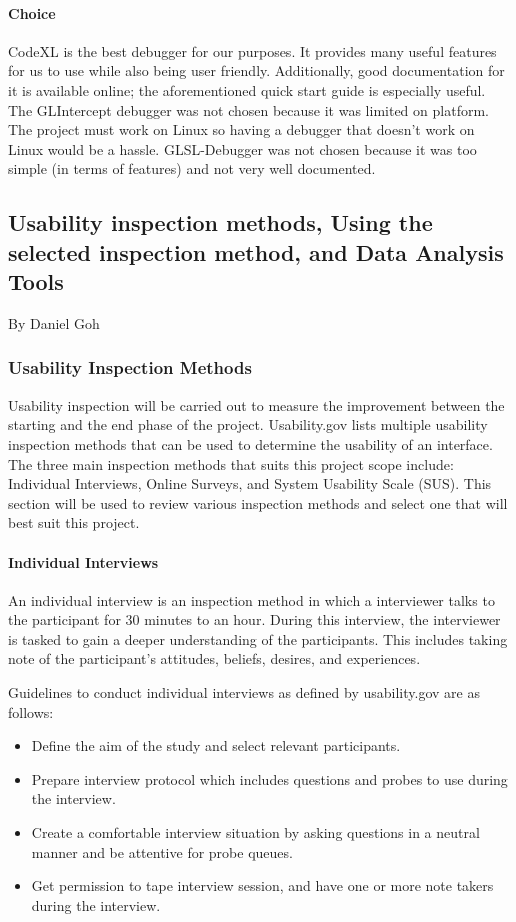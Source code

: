 \paragraph{Choice}
CodeXL is the best debugger for our purposes.
It provides many useful features for us to use while also being user friendly. 
Additionally, good documentation for it is available online; the aforementioned quick start guide is especially useful.
The GLIntercept debugger was not chosen because it was limited on platform.
The project must work on Linux so having a debugger that doesn't work on Linux would be a hassle.
GLSL-Debugger was not chosen because it was too simple (in terms of features) and not very well documented.

\newpage

\subsection{Usability inspection methods, Using the selected inspection method, and Data Analysis Tools}
\large{By Daniel Goh}

\normalsize
\subsubsection{Usability Inspection Methods}
Usability inspection will be carried out to measure the improvement between the starting and the end phase of the project.
Usability.gov lists multiple usability inspection methods that can be used to determine the usability of an interface. \cite{userResearch}
The three main inspection methods that suits this project scope include: Individual Interviews, Online Surveys, and System Usability Scale (SUS).
This section will be used to review various inspection methods and select one that will best suit this project.

\paragraph{Individual Interviews}
An individual interview is an inspection method in which a interviewer talks to the participant for 30 minutes to an hour.
During this interview, the interviewer is tasked to gain a deeper understanding of the participants.
This includes taking note of the participant's attitudes, beliefs, desires, and experiences.

Guidelines to conduct individual interviews as defined by usability.gov are as follows:
\begin{itemize}
\item Define the aim of the study and select relevant participants.
\item Prepare interview protocol which includes questions and probes to use during the interview.
\item Create a comfortable interview situation by asking questions in a neutral manner and be attentive for probe queues.
\item Get permission to tape interview session, and have one or more note takers during the interview.
\end{itemize}

